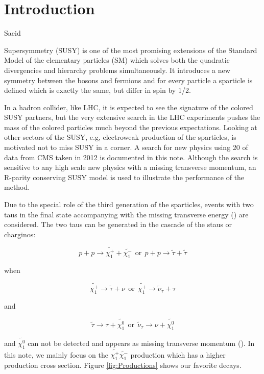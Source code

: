 \section{Introduction}
\label{sect:introduction}

Saeid

Supersymmetry \cite{Martin:1997ns} (SUSY) is one of the most promising extensions of the 
Standard Model of the elementary particles (SM) which solves both the 
quadratic divergencies and hierarchy problems simultaneously. It introduces a new symmetry between the bosons and fermions and 
for every particle a sparticle is defined which is exactly the same, but differ in spin by 1/2. 

In a hadron collider, like LHC, it is expected to see the signature of the colored SUSY partners, 
but the very extensive search in the LHC experiments pushes the mass of the colored particles much 
beyond the previous expectations. 
Looking at other sectors of the SUSY, e.g, electroweak production of the sparticles, is motivated not to miss SUSY in a corner.
A search for new physics using 20 \invfb of data from CMS taken in 2012 is documented in this note. 
Although the search is sensitive to any high scale 
new physics with a missing transverse momentum, an R-parity conserving SUSY model is used 
to illustrate the performance of the method.

Due to the special role of the third generation of the sparticles, events with two taus in the final state 
accompanying with the missing transverse energy (\met) are considered.
The two taus can be generated in the cascade of the staus or charginos:
\begin{linenomath}
\begin{equation}
p + p \rightarrow \tilde{\chi_{1}^{+}} + \tilde{\chi_{1}^{-}} ~~\mathrm{or}~~  p + p \rightarrow \tilde{\tau} + \tilde{\tau}
\end{equation}
\end{linenomath}
when 
\begin{linenomath}
\begin{equation}
\tilde{\chi_{1}^{+}} \rightarrow \tilde{\tau} + \nu ~~\mathrm{or}~~  \tilde{\chi_{1}^{+}} \rightarrow \tilde{\nu}_{\tau} + \tau 
\end{equation}
\end{linenomath}
and 
\begin{linenomath}
\begin{equation}
\tilde{\tau} \rightarrow \tau + \tilde{\chi_{1}^{0}} ~~\mathrm{or}~~  \tilde{\nu}_{\tau} \rightarrow \nu + \tilde{\chi_{1}^{0}} 
\end{equation}
\end{linenomath}
and $\tilde{\chi_{1}^{0}}$ can not be detected and appears as missing transverse momentum (\met).
In this note, we mainly focus on the $\tilde{\chi_{1}^{+}}\tilde{\chi_{1}^{-}}$ production which has a higher 
production cross section. Figure \ref{fig:Productions} shows our favorite decays.

